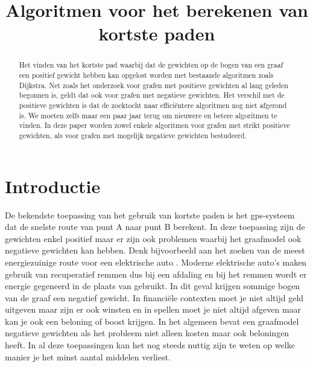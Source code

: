 \documentclass[conference]{IEEEtran}
\theoremstyle{definition}
\theoremstyle{remark}
\begin{document}
\title{Algoritmen voor het berekenen van kortste paden}

\author{
}

\maketitle
\pagestyle{plain}

\begin{abstract}
Het vinden van het kortste pad waarbij dat de gewichten op de bogen van een graaf een positief gewicht hebben kan opgelost worden met bestaande algoritmen zoals Dijkstra. Net zoals het onderzoek voor grafen met positieve gewichten al lang geleden begonnen is, geldt dat ook voor grafen met negatieve gewichten. Het verschil met de positieve gewichten is dat de zoektocht naar efficiëntere algoritmen nog niet afgerond is. We moeten zelfs maar een paar jaar terug om nieuwere en betere algoritmen te vinden. In deze paper worden zowel enkele algoritmen voor grafen met strikt positieve gewichten, als voor grafen met mogelijk negatieve gewichten bestudeerd.
\end{abstract}

\section*{Introductie}
De bekendste toepassing van het gebruik van kortste paden is het gps-systeem dat de snelste route van punt A naar punt B berekent. In deze toepassing zijn de gewichten enkel positief maar er zijn ook problemen waarbij het graafmodel ook negatieve gewichten kan hebben. Denk bijvoorbeeld aan het zoeken van de meest energiezuinige route voor een elektrische auto \cite{negatief}. Moderne elektrische auto's maken gebruik van recuperatief remmen dus bij een afdaling en bij het remmen wordt er energie gegeneerd in de plaats van gebruikt. In dit geval krijgen sommige bogen van de graaf een negatief gewicht. In financiële contexten moet je niet altijd geld uitgeven maar zijn er ook winsten en in spellen moet je niet altijd afgeven maar kan je ook een beloning of boost krijgen. In het algemeen bevat een graafmodel negatieve gewichten als het probleem niet alleen kosten maar ook beloningen heeft. In al deze toepassingen kan het nog steeds nuttig zijn te weten op welke manier je het minst aantal middelen verliest.
\end{document}
